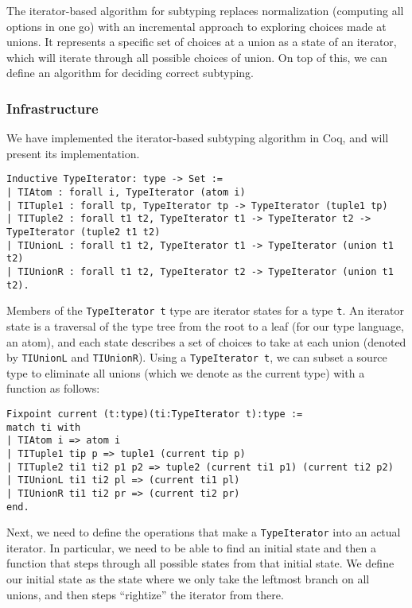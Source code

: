 \documentclass[a4paper,UKenglish]{lipics-v2018}
\begin{document}
The iterator-based algorithm for subtyping replaces normalization (computing all options
in one go) with an incremental approach to exploring choices made at unions. It represents
a specific set of choices at a union as a state of an iterator, which will iterate through
all possible choices of union. On top of this, we can define an algorithm for deciding correct
subtyping.

\subsubsection{Infrastructure}

We have implemented the iterator-based subtyping algorithm in Coq, and will
present its implementation.

\begin{verbatim}
Inductive TypeIterator: type -> Set :=
| TIAtom : forall i, TypeIterator (atom i)
| TITuple1 : forall tp, TypeIterator tp -> TypeIterator (tuple1 tp)
| TITuple2 : forall t1 t2, TypeIterator t1 -> TypeIterator t2 -> TypeIterator (tuple2 t1 t2)
| TIUnionL : forall t1 t2, TypeIterator t1 -> TypeIterator (union t1 t2)
| TIUnionR : forall t1 t2, TypeIterator t2 -> TypeIterator (union t1 t2).
\end{verbatim}

Members of the \verb|TypeIterator t| type are iterator states for a type
\verb|t|. An iterator state is a traversal of the type tree from the root to a leaf
(for our type language, an atom), and each state describes a set of choices to take
at each union (denoted by \verb|TIUnionL| and \verb|TIUnionR|). Using a \verb|TypeIterator t|,
we can subset a source type to eliminate all unions (which we denote as the current type) with
a function as follows:

\begin{verbatim}
Fixpoint current (t:type)(ti:TypeIterator t):type :=
match ti with
| TIAtom i => atom i
| TITuple1 tip p => tuple1 (current tip p)
| TITuple2 ti1 ti2 p1 p2 => tuple2 (current ti1 p1) (current ti2 p2)
| TIUnionL ti1 ti2 pl => (current ti1 pl)
| TIUnionR ti1 ti2 pr => (current ti2 pr)
end.
\end{verbatim}

Next, we need to define the operations that make a \verb|TypeIterator| into an actual
iterator. In particular, we need to be able to find an initial state and then a function
that steps through all possible states from that initial state. We define our initial state
as the state where we only take the leftmost branch on all unions, and then steps ``rightize''
the iterator from there.
\end{document}
